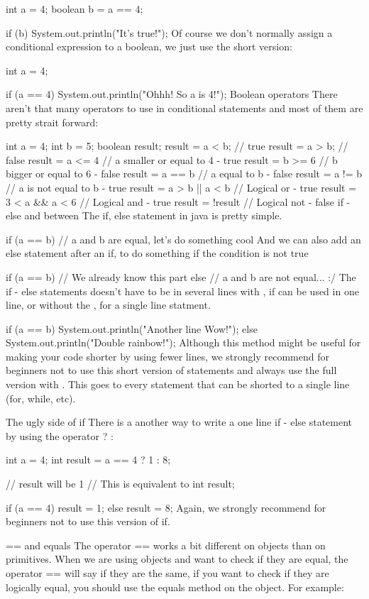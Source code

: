 int a = 4;
boolean b = a == 4;

if (b) {
    System.out.println("It's true!");
}
Of course we don't normally assign a conditional expression to a boolean, we just use the short version:

int a = 4;

if (a == 4) {
    System.out.println("Ohhh! So a is 4!");
}
Boolean operators
There aren't that many operators to use in conditional statements and most of them are pretty strait forward:

int a = 4;
int b = 5;
boolean result;
result = a < b; // true
result = a > b; // false
result = a <= 4 // a smaller or equal to 4 - true
result = b >= 6 // b bigger or equal to 6 - false
result = a == b // a equal to b - false
result = a != b // a is not equal to b - true
result = a > b || a < b // Logical or - true
result = 3 < a && a < 6 // Logical and - true
result = !result // Logical not - false
if - else and between
The if, else statement in java is pretty simple.

if (a == b) {
    // a and b are equal, let's do something cool
}
And we can also add an else statement after an if, to do something if the condition is not true

if (a == b) {
    // We already know this part
} else {
    // a and b are not equal... :/
}
The if - else statements doesn't have to be in several lines with {}, if can be used in one line, or without the {}, for a single line statment.

if (a == b)
    System.out.println("Another line Wow!");
else
    System.out.println("Double rainbow!");
Although this method might be useful for making your code shorter by using fewer lines, we strongly recommend for beginners not to use this short version of statements and always use the full version with {}. This goes to every statement that can be shorted to a single line (for, while, etc).

The ugly side of if
There is a another way to write a one line if - else statement by using the operator ? :

int a = 4;
int result = a == 4 ? 1 : 8;

// result will be 1
// This is equivalent to
int result;

if (a == 4) {
    result = 1;
} else {
    result = 8;
}
Again, we strongly recommend for beginners not to use this version of if.

== and equals
The operator == works a bit different on objects than on primitives. When we are using objects and want to check if they are equal, the operator == will say if they are the same, if you want to check if they are logically equal, you should use the equals method on the object. For example:

